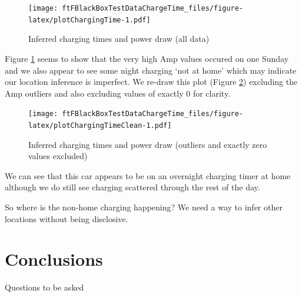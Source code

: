 \documentclass[]{article}
\begin{document}
\begin{figure}
\centering
\texttt{[image: ftFBlackBoxTestDataChargeTime\_files/figure-latex/plotChargingTime-1.pdf]}
\caption{\label{fig:plotChargingTime}Inferred charging times and power draw
(all data)}
\end{figure}

Figure \ref{fig:plotChargingTime} seems to show that the very high Amp
values occured on one Sunday and we also appear to see some night
charging `not at home' which may indicate our location inference is
imperfect. We re-draw this plot (Figure \ref{fig:plotChargingTimeClean})
excluding the Amp outliers and also excluding values of exactly 0 for
clarity.

\begin{figure}
\centering
\texttt{[image: ftFBlackBoxTestDataChargeTime\_files/figure-latex/plotChargingTimeClean-1.pdf]}
\caption{\label{fig:plotChargingTimeClean}Inferred charging times and power
draw (outliers and exactly zero values excluded)}
\end{figure}

We can see that this car appears to be on an overnight charging timer at
home although we do still see charging scattered through the rest of the
day.

So where is the non-home charging happening? We need a way to infer
other locations without being disclosive.

\section{Conclusions}\label{conclusions}

Questions to be asked
\end{document}
